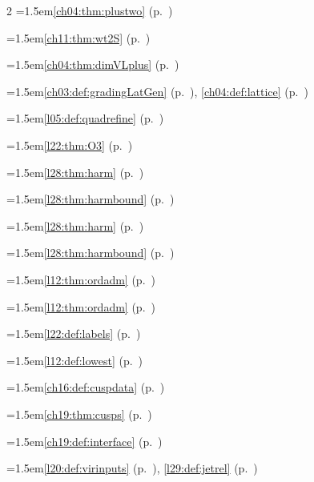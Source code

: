 \begin{multicols}{2}
\hangindent=1.5em\quad \ref{ch04:thm:plustwo} (p.~\pageref{ch04:thm:plustwo})\par
\hangindent=1.5em\quad \ref{ch11:thm:wt2S} (p.~\pageref{ch11:thm:wt2S})\par
\hangindent=1.5em\quad \ref{ch04:thm:dimVLplus} (p.~\pageref{ch04:thm:dimVLplus})\par
\hangindent=1.5em\quad \ref{ch03:def:gradingLatGen} (p.~\pageref{ch03:def:gradingLatGen}), \ref{ch04:def:lattice} (p.~\pageref{ch04:def:lattice})\par
\hangindent=1.5em\quad \ref{l05:def:quadrefine} (p.~\pageref{l05:def:quadrefine})\par
\hangindent=1.5em\quad \ref{l22:thm:O3} (p.~\pageref{l22:thm:O3})\par
\hangindent=1.5em\quad \ref{l28:thm:harm} (p.~\pageref{l28:thm:harm})\par
\hangindent=1.5em\quad \ref{l28:thm:harmbound} (p.~\pageref{l28:thm:harmbound})\par
\hangindent=1.5em\quad \ref{l28:thm:harm} (p.~\pageref{l28:thm:harm})\par
\hangindent=1.5em\quad \ref{l28:thm:harmbound} (p.~\pageref{l28:thm:harmbound})\par
\hangindent=1.5em\quad \ref{l12:thm:ordadm} (p.~\pageref{l12:thm:ordadm})\par
\hangindent=1.5em\quad \ref{l12:thm:ordadm} (p.~\pageref{l12:thm:ordadm})\par
\hangindent=1.5em\quad \ref{l22:def:labels} (p.~\pageref{l22:def:labels})\par
\hangindent=1.5em\quad \ref{l12:def:lowest} (p.~\pageref{l12:def:lowest})\par
\hangindent=1.5em\quad \ref{ch16:def:cuspdata} (p.~\pageref{ch16:def:cuspdata})\par
\hangindent=1.5em\quad \ref{ch19:thm:cusps} (p.~\pageref{ch19:thm:cusps})\par
\hangindent=1.5em\quad \ref{ch19:def:interface} (p.~\pageref{ch19:def:interface})\par
\hangindent=1.5em\quad \ref{l20:def:virinputs} (p.~\pageref{l20:def:virinputs}), \ref{l29:def:jetrel} (p.~\pageref{l29:def:jetrel})\par

\end{multicols}
